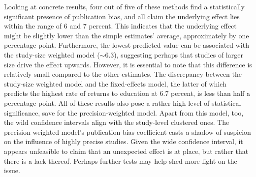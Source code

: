 Looking at concrete results, four out of five of these methods find a statistically significant presence of publication bias, and all claim the underlying effect lies within the range of 6 and 7 percent. This indicates that the underlying effect might be slightly lower than the simple estimates' average, approximately by one percentage point. Furthermore, the lowest predicted value can be associated with the study-size weighted model ($\sim$6.3), suggesting perhaps that studies of larger size drive the effect upwards. However, it is essential to note that this difference is relatively small compared to the other estimates. The discrepancy between the study-size weighted model and the fixed-effects model, the latter of which predicts the highest rate of returns to education at 6.7 percent, is less than half a percentage point. All of these results also pose a rather high level of statistical significance, save for the precision-weighted model. Apart from this model, too, the wild confidence intervals align with the study-level clustered ones. The precision-weighted model's publication bias coefficient casts a shadow of suspicion on the influence of highly precise studies. Given the wide confidence interval, it appears unfeasible to claim that an unexpected effect is at place, but rather that there is a lack thereof. Perhaps further tests may help shed more light on the issue.


